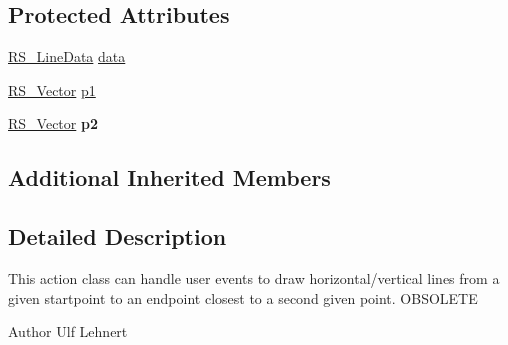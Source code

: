 \subsection*{Protected Attributes}
\begin{DoxyCompactItemize}
\item 
\hyperlink{classRS__LineData}{R\-S\-\_\-\-Line\-Data} \hyperlink{classRS__ActionDrawLineHorVert_a538689d942230a9deefa6515810a2741}{data}
\item 
\hyperlink{classRS__Vector}{R\-S\-\_\-\-Vector} \hyperlink{classRS__ActionDrawLineHorVert_addc14b0ec8af070cb8586360bb8decc9}{p1}
\item 
\hypertarget{classRS__ActionDrawLineHorVert_af3347397cc9344567281883c77d7d40d}{\hyperlink{classRS__Vector}{R\-S\-\_\-\-Vector} {\bfseries p2}}\label{classRS__ActionDrawLineHorVert_af3347397cc9344567281883c77d7d40d}

\end{DoxyCompactItemize}
\subsection*{Additional Inherited Members}


\subsection{Detailed Description}
This action class can handle user events to draw horizontal/vertical lines from a given startpoint to an endpoint closest to a second given point. O\-B\-S\-O\-L\-E\-T\-E

\begin{DoxyAuthor}{Author}
Ulf Lehnert 
\end{DoxyAuthor}


